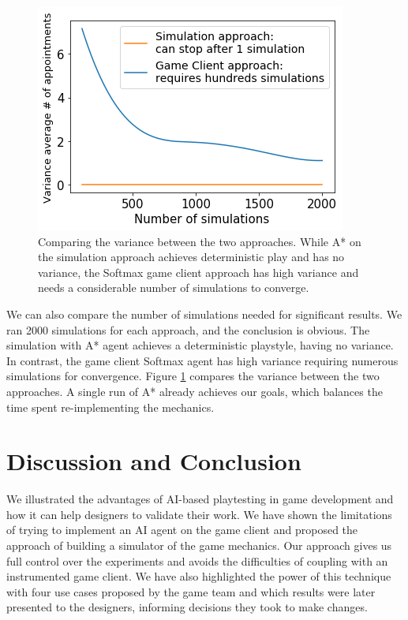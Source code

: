 \documentclass[letterpaper]{article} %
\begin{document}
\begin{figure}[t]
  \centering
  \includegraphics[width=0.943\linewidth]{images/career_average.png}
  \caption{Comparing the variance between the two approaches. While A* on the simulation approach achieves deterministic play and has no variance, the Softmax game client approach has high variance and needs a considerable number of simulations to converge.}
  \label{Figure:approach_variance_comp}
\end{figure}

We can also compare the number of simulations needed for significant results. We ran 2000 simulations for each approach, and the conclusion is obvious. The simulation with A* agent achieves a deterministic playstyle, having no variance. In contrast, the game client Softmax agent has high variance requiring numerous simulations for convergence. Figure \ref{Figure:approach_variance_comp} compares the variance between the two approaches. A single run of A* already achieves our goals, which balances the time spent re-implementing the mechanics.

\section{Discussion and Conclusion}

We illustrated the advantages of AI-based playtesting in game development and how it can help designers to validate their work. We have shown the limitations of trying to implement an AI agent on the game client and proposed the approach of building a simulator of the game mechanics. Our approach gives us full control over the experiments and avoids the difficulties of coupling with an instrumented game client. We have also highlighted the power of this technique with four use cases proposed by the game team and which results were later presented to the designers, informing decisions they took to make changes.
%
%
\end{document}
